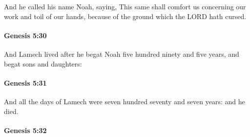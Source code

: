 			And he called his name Noah, saying, This same shall comfort us concerning our work and toil of our hands, because of the ground which the LORD hath cursed.


		\paragraph{Genesis 5:30} %
			\label{GENESIS-5-30}

			And Lamech lived after he begat Noah five hundred ninety and five years, and begat sons and daughters:


		\paragraph{Genesis 5:31} %
			\label{GENESIS-5-31}

			And all the days of Lamech were seven hundred seventy and seven years: and he died.


		\paragraph{Genesis 5:32} %
			\label{GENESIS-5-32}

